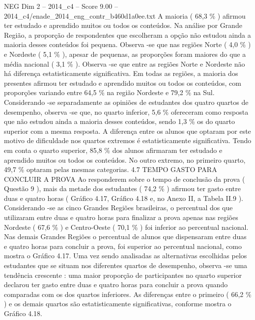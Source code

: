 \begin{textsample}{NEG Dim 2 – 2014\_c4 – Score 9.00 – 2014\_c4/enade\_2014\_eng\_contr\_b460d1a0ee.txt}
A maioria ( 68,3 \% ) afirmou ter estudado e aprendido muitos ou todos os conteúdos.
Na análise por Grande Região, a proporção de respondentes que escolheram a opção não estudou ainda a maioria desses conteúdos foi pequena.
Observa -se que nas regiões Norte ( 4,0 \% ) e Nordeste ( 5,1 \% ), apesar de pequenas, as proporções foram maiores do que a média nacional ( 3,1 \% ).
Observa -se que entre as regiões Norte e Nordeste não há diferença estatisticamente significativa.
Em todas as regiões, a maioria dos presentes afirmou ter estudado e aprendido muitos ou todos os conteúdos, com proporções variando entre 64,5 \% na região Nordeste e 79,2 \% na Sul.
Considerando -se separadamente as opiniões de estudantes dos quatro quartos de desempenho, observa -se que, no quarto inferior, 5,6 \% ofereceram como resposta que não estudou ainda a maioria desses conteúdos, sendo 1,3 \% os do quarto superior com a mesma resposta.
A diferença entre os alunos que optaram por este motivo de dificuldade nos quartos extremos é estatisticamente significativa.
Tendo em conta o quarto superior, 85,8 \% dos alunos afirmaram ter estudado e aprendido muitos ou todos os conteúdos.
No outro extremo, no primeiro quarto, 49,7 \% optaram pelas mesmas categorias. 4.7 TEMPO GASTO PARA CONCLUIR A PROVA Ao responderem sobre o tempo de conclusão da prova ( Questão 9 ), mais da metade dos estudantes ( 74,2 \% ) afirmou ter gasto entre duas e quatro horas ( Gráfico 4.17, Gráfico 4.18 e, no Anexo II, a Tabela II.9 ).
Considerando -se as cinco Grandes Regiões brasileiras, o percentual dos que utilizaram entre duas e quatro horas para finalizar a prova apenas nas regiões Nordeste ( 67,6 \% ) e Centro-Oeste ( 70,1 \% ) foi inferior ao percentual nacional.
Nas demais Grandes Regiões o percentual de alunos que dispensaram entre duas e quatro horas para concluir a prova, foi superior ao percentual nacional, como mostra o Gráfico 4.17.
Uma vez sendo analisadas as alternativas escolhidas pelos estudantes que se situam nos diferentes quartos de desempenho, observa -se uma tendência crescente : uma maior proporção de participantes no quarto superior declarou ter gasto entre duas e quatro horas para concluir a prova quando comparadas com os dos quartos inferiores.
As diferenças entre o primeiro ( 66,2 \% ) e os demais quartos são estatisticamente significativas, conforme mostra o Gráfico 4.18.

\end{textsample}
